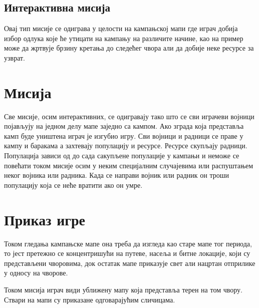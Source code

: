 \documentclass[11pt,a4paper]{article}
\begin{document}
\subsection{Интерактивна мисија}
Овај тип мисије се одиграва у целости на кампањској мапи где играч добија избор одлука које ће утицати на кампању на различите начине, као на пример може да жртвује брзину кретања до следећег чвора али да добије неке ресурсе за узврат.
\section{Мисија}
Све мисије, осим интерактивних, се одигравају тако што се сви играчеви војници појављују на једном делу мапе заједно са кампом. Ако зграда која представља камп буде уништена играч је изгубио игру. Сви војници и радници се праве у кампу и баракама а захтевају популацију и ресурсе. Ресурсе скупљају радници. Популација зависи од до сада сакупљене популације  у кампањи и неможе се повећати током мисије осим у неким специјалним случајевима или распуштањем неког војника или радника. Када се направи војник или радник он троши популацију која се неће вратити ако он умре. 
\section{Приказ игре}
Током гледања кампањске мапе она треба да изгледа као старе мапе тог периода, то јест претежно се концентришући на путеве, насеља и битне локације, који су представљени чворовима, док остатак мапе приказује свет али нацртан отприлике у односу на чворове.

Током мисија играч види уближену мапу која представља терен на том чвору. Ствари на мапи су приказане одговарајућим сличицама. 
\newpage
\end{document}
